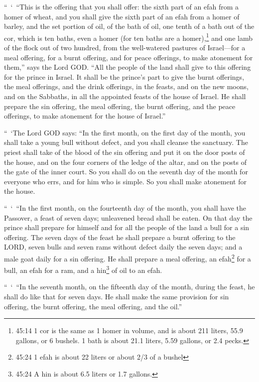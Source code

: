 \myverse{}“ ‘ “This is the offering that you shall offer: the sixth part
of an efah from a homer of wheat, and you shall give the sixth part of an efah from a homer of barley,
\myverse{}and the set portion of oil, of the bath of oil, one tenth of a bath out of
the cor, which is ten baths, even a homer (for ten baths are a homer),\footnote{45:14 1 cor is the same as 1 homer in volume, and is about 211 liters, 55.9 gallons, or 6 bushels.
	1 bath is about 21.1 liters, 5.59 gallons, or 2.4 pecks.}
\myverse{}and one lamb of the flock out of two hundred, from the well-watered pastures
of Israel—for a meal offering, for a burnt offering, and for peace offerings, to make atonement for them,”
says the Lord GOD.
\myverse{}“All the people of the land shall give to this offering for the prince in
Israel.
\myverse{}It shall be the prince’s part to give the burnt offerings, the meal offerings,
and the drink offerings, in the feasts, and on the new moons, and on the Sabbaths, in all the appointed
feasts of the house of Israel. He shall prepare the sin offering, the meal offering, the burnt offering,
and the peace offerings, to make atonement for the house of Israel.”

\myverse{}“ ‘The Lord GOD says: “In the first month, on the first day of
the month, you shall take a young bull without defect, and you shall cleanse the sanctuary.
\myverse{}The priest shall take of the blood of the sin offering and put it on the
door posts of the house, and on the four corners of the ledge of the altar, and on the posts of the gate
of the inner court.
\myverse{}So you shall do on the seventh day of the month for everyone who errs, and
for him who is simple. So you shall make atonement for the house.

\myverse{}“ ‘ “In the first month, on the fourteenth day of the month, you
shall have the Passover, a feast of seven days; unleavened bread shall be eaten.
\myverse{}On that day the prince shall prepare for himself and for all the people of
the land a bull for a sin offering.
\myverse{}The seven days of the feast he shall prepare a burnt offering to the LORD,
seven bulls and seven rams without defect daily the seven days; and a male goat daily for a sin offering.
\myverse{}He shall prepare a meal offering, an efah\footnote{45:24 1 efah is about 22 liters or about 2/3 of a bushel} for a bull, an efah for a ram, and
a hin\footnote{45:24 A hin is about 6.5 liters or 1.7 gallons.} of oil to an efah.

\myverse{}“ ‘ “In the seventh month, on the fifteenth day of the month,
during the feast, he shall do like that for seven days. He shall make the same provision for sin offering,
the burnt offering, the meal offering, and the oil.”


